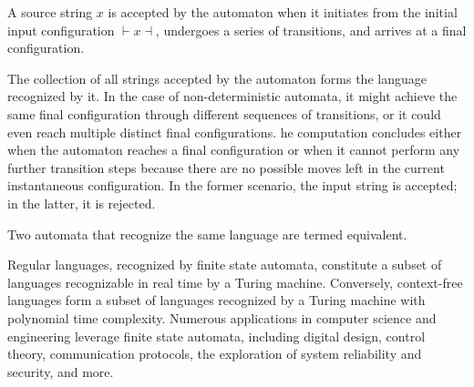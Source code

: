 \begin{definition}
    A source string $x$ is accepted by the automaton when it initiates from the initial input configuration $\vdash x \dashv$, undergoes a series of transitions, and arrives at a final configuration.
\end{definition}
The collection of all strings accepted by the automaton forms the language recognized by it.
In the case of non-deterministic automata, it might achieve the same final configuration through different sequences of transitions, or it could even reach multiple distinct final configurations.
he computation concludes either when the automaton reaches a final configuration or when it cannot perform any further transition steps because there are no possible moves left in the current instantaneous configuration. 
In the former scenario, the input string is accepted; in the latter, it is rejected.
\begin{definition}
    Two automata that recognize the same language are termed equivalent.
\end{definition}
Regular languages, recognized by finite state automata, constitute a subset of languages recognizable in real time by a Turing machine.
Conversely, context-free languages form a subset of languages recognized by a Turing machine with polynomial time complexity.
Numerous applications in computer science and engineering leverage finite state automata, including digital design, control theory, communication protocols, the exploration of system reliability and security, and more.